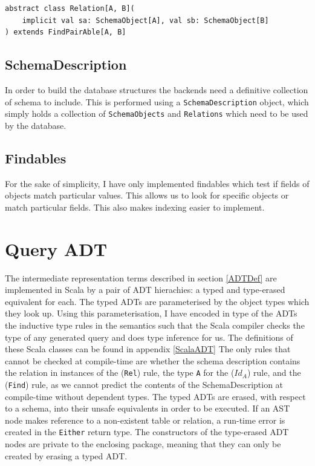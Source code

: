 \documentclass[12pt,a4paper,twoside,openright]{report}
\newcommand\codeName[1]{\texttt{#1}}
\renewcommand{\baselinestretch}{1.1}    %
\begin{document}
\renewcommand{\baselinestretch}{0.8}
\begin{framed}
\begin{verbatim}
abstract class Relation[A, B](
    implicit val sa: SchemaObject[A], val sb: SchemaObject[B]
) extends FindPairAble[A, B]
\end{verbatim}
\end{framed}
\renewcommand{\baselinestretch}{1.1}



	
	\subsection{SchemaDescription}
	
In order to build the database structures the backends need a definitive collection of schema to include. This is performed using a \codeName{SchemaDescription} object, which simply holds a collection of \codeName{SchemaObjects} and \codeName{Relations} which need to be used by the database.	
	
	\subsection{Findables}
	For the sake of simplicity, I have only implemented findables which test if fields of objects match particular values. This allows us to look for specific objects or match particular fields. This also makes indexing easier to implement.
	
\section{Query ADT}
The intermediate representation terms described in  section \ref{ADTDef} are implemented in Scala by a pair of ADT hierachies: a typed and type-erased equivalent for each. The typed ADTs are parameterised by the object types which they look up. Using this parameterisation, I have encoded in type of the ADTs the inductive type rules in the semantics such that the Scala compiler checks the type of any generated query and does type inference for us. The definitions of these Scala classes can be found in appendix \ref{ScalaADT} The only rules that cannot be checked at compile-time are whether the schema description contains the relation in instances of the (\codeName{Rel}) rule, the type \codeName{A} for the (\codeName{$Id_A$}) rule, and the (\codeName{Find}) rule, as we cannot predict the contents of the SchemaDescription at compile-time without dependent types.  The typed ADTs are erased, with respect to a schema,  into their unsafe equivalents in order to be executed. If an AST node makes reference to a non-existent table or relation, a run-time error is created in the \codeName{Either} return type. The constructors of the type-erased ADT nodes are private to the enclosing package, meaning that they can only be created by erasing a typed ADT.
	
\end{document}
